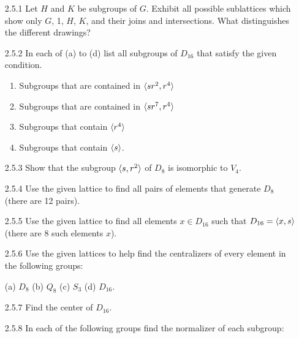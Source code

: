 \begin{enumerate}
   \item[2.5.1]   Let $H$ and $K$ be subgroups of $G$. Exhibit all possible
                  sublattices which show only $G$, 1, $H$, $K$, and their joins
                  and intersections. What distinguishes the different drawings?
   \item[2.5.2]   In each of (a) to (d) list all subgroups of $D_{16}$ that
                  satisfy the given condition.
                  \begin{enumerate}
                     \item Subgroups that are contained in $\langle sr^2, r^4 \rangle$
                     \item Subgroups that are contained in $\langle sr^7, r^4 \rangle$
                     \item Subgroups that contain $\langle r^4 \rangle$
                     \item Subgroups that contain $\langle s \rangle$.
                  \end{enumerate}
   \item[2.5.3]   Show that the subgroup $\langle s, r^2 \rangle$ of $D_8$ is isomorphic
                  to $V_4$.
   \item[2.5.4]   Use the given lattice to find all pairs of elements that
                  generate $D_8$ (there are 12 pairs).
   \item[2.5.5]   Use the given lattice to find all elements $x \in D_{16}$
                  such that $D_{16} = \langle x, s \rangle$ (there are 8 such elements
                  $x$).
   \item[2.5.6]   Use the given lattices to help find the centralizers of every
                  element in the following groups:

                  (a) $D_8$ \qquad (b) $Q_8$ \qquad
                  (c) $S_3$ \qquad (d) $D_{16}$.
   \item[2.5.7]   Find the center of $D_{16}$.
   \item[2.5.8]   In each of the following groups find the normalizer of each
                  subgroup:


\end{enumerate}
